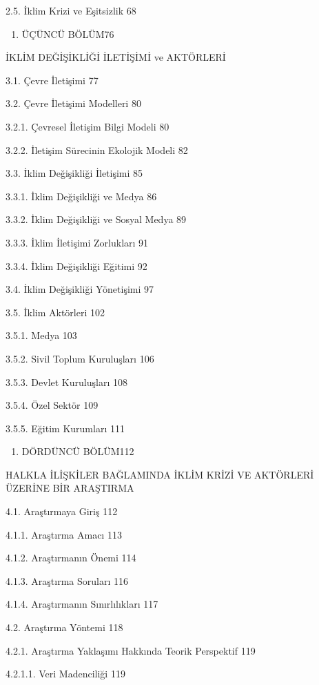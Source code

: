 \documentclass[
]{book}
\providecommand{\tightlist}{%
  \setlength{\itemsep}{0pt}\setlength{\parskip}{0pt}}
\begin{document}
2.5. İklim Krizi ve Eşitsizlik 68

\begin{enumerate}
\def\labelenumi{\arabic{enumi}.}
\setcounter{enumi}{2}
\tightlist
\item
  ÜÇÜNCÜ BÖLÜM76
\end{enumerate}

İKLİM DEĞİŞİKLİĞİ İLETİŞİMİ ve AKTÖRLERİ

3.1. Çevre İletişimi 77

3.2. Çevre İletişimi Modelleri 80

3.2.1. Çevresel İletişim Bilgi Modeli 80

3.2.2. İletişim Sürecinin Ekolojik Modeli 82

3.3. İklim Değişikliği İletişimi 85

3.3.1. İklim Değişikliği ve Medya 86

3.3.2. İklim Değişikliği ve Sosyal Medya 89

3.3.3. İklim İletişimi Zorlukları 91

3.3.4. İklim Değişikliği Eğitimi 92

3.4. İklim Değişikliği Yönetişimi 97

3.5. İklim Aktörleri 102

3.5.1. Medya 103

3.5.2. Sivil Toplum Kuruluşları 106

3.5.3. Devlet Kuruluşları 108

3.5.4. Özel Sektör 109

3.5.5. Eğitim Kurumları 111

\begin{enumerate}
\def\labelenumi{\arabic{enumi}.}
\setcounter{enumi}{3}
\tightlist
\item
  DÖRDÜNCÜ BÖLÜM112
\end{enumerate}

HALKLA İLİŞKİLER BAĞLAMINDA İKLİM KRİZİ VE AKTÖRLERİ ÜZERİNE BİR ARAŞTIRMA

4.1. Araştırmaya Giriş 112

4.1.1. Araştırma Amacı 113

4.1.2. Araştırmanın Önemi 114

4.1.3. Araştırma Soruları 116

4.1.4. Araştırmanın Sınırlılıkları 117

4.2. Araştırma Yöntemi 118

4.2.1. Araştırma Yaklaşımı Hakkında Teorik Perspektif 119

4.2.1.1. Veri Madenciliği 119
\end{document}
